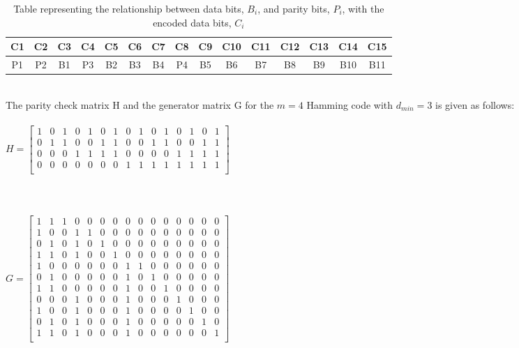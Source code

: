 \documentclass[ee577b,acmnow]{acmtrans2m}
\begin{document}
\begin{table}
\caption{Table representing the relationship between data bits, $B_{i}$, and parity bits, $P_{i}$, with the encoded data bits, $C_{i}$}
\label{bitscbp}
\begin{tabular}{|c|c|c|c|c|c|c|c|c|c|c|c|c|c|c|}
\hline
C1 & C2 & C3 & C4 & C5 & C6 & C7 & C8 & C9 & C10 & C11 & C12 & C13 & C14 & C15\\
\hline
P1 & P2 & B1 & P3 & B2 & B3 & B4 & P4 & B5 & B6 & B7 & B8 & B9 & B10 & B11\\
\hline
\end{tabular}
\end{table}
\ \\
The parity check matrix H and the generator matrix G for the $m = 4$ Hamming code with $d_{min} = 3$ is given as follows: \\
\ \\
$H = \left [ \begin{array}{ccccccccccccccc}
1 & 0 & 1 & 0 & 1 & 0 & 1 & 0 & 1 & 0 & 1 & 0 & 1 & 0 & 1 \\
0 & 1 & 1 & 0 & 0 & 1 & 1 & 0 & 0 & 1 & 1 & 0 & 0 & 1 & 1 \\
0 & 0 & 0 & 1 & 1 & 1 & 1 & 0 & 0 & 0 & 0 & 1 & 1 & 1 & 1 \\
0 & 0 & 0 & 0 & 0 & 0 & 0 & 1 & 1 & 1 & 1 & 1 & 1 & 1 & 1 \\
\end{array} \right ] $\\
\ \\
\ \\
\ \\
$G = \left [ \begin{array}{ccccccccccccccc}
1 & 1 & 1 & 0 & 0 & 0 & 0 & 0 & 0 & 0 & 0 & 0 & 0 & 0 & 0 \\
1 & 0 & 0 & 1 & 1 & 0 & 0 & 0 & 0 & 0 & 0 & 0 & 0 & 0 & 0 \\
0 & 1 & 0 & 1 & 0 & 1 & 0 & 0 & 0 & 0 & 0 & 0 & 0 & 0 & 0 \\
1 & 1 & 0 & 1 & 0 & 0 & 1 & 0 & 0 & 0 & 0 & 0 & 0 & 0 & 0 \\
1 & 0 & 0 & 0 & 0 & 0 & 0 & 1 & 1 & 0 & 0 & 0 & 0 & 0 & 0 \\
0 & 1 & 0 & 0 & 0 & 0 & 0 & 1 & 0 & 1 & 0 & 0 & 0 & 0 & 0 \\
1 & 1 & 0 & 0 & 0 & 0 & 0 & 1 & 0 & 0 & 1 & 0 & 0 & 0 & 0 \\
0 & 0 & 0 & 1 & 0 & 0 & 0 & 1 & 0 & 0 & 0 & 1 & 0 & 0 & 0 \\
1 & 0 & 0 & 1 & 0 & 0 & 0 & 1 & 0 & 0 & 0 & 0 & 1 & 0 & 0 \\
0 & 1 & 0 & 1 & 0 & 0 & 0 & 1 & 0 & 0 & 0 & 0 & 0 & 1 & 0 \\
1 & 1 & 0 & 1 & 0 & 0 & 0 & 1 & 0 & 0 & 0 & 0 & 0 & 0 & 1 \\
\end{array} \right ] $\\
\ \\
\ \\
\ \\
\end{document}
